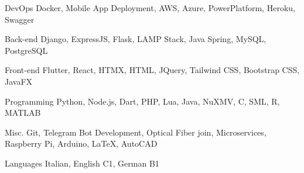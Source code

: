 

\begin{cvskills}

  \cvskill
    {DevOps} %
    {Docker, Mobile App Deployment, AWS, Azure, PowerPlatform, Heroku, Swagger} %

  \cvskill
    {Back-end} %
    {Django, ExpressJS, Flask, LAMP Stack, Java Spring, MySQL, PostgreSQL} %

  \cvskill
    {Front-end} %
    {Flutter, React, HTMX, HTML, JQuery, Tailwind CSS, Bootstrap CSS, JavaFX} %

  \cvskill
    {Programming} %
    {Python, Node.js, Dart, PHP, Lua, Java, NuXMV, C, SML, R, MATLAB} %

  \cvskill
  {Misc.} %
  {Git, Telegram Bot Development, Optical Fiber join, Microservices, Raspberry Pi, Arduino, LaTeX, AutoCAD} %

  \cvskill
    {Languages} %
    {Italian, English C1, German B1} %

\end{cvskills}
